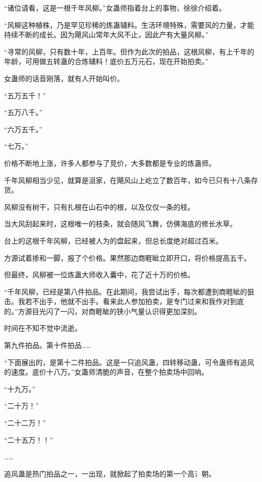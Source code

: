 
\begin{this_body}



“诸位请看，这是一根千年风柳。”女蛊师指着台上的事物，徐徐介绍着。

“风柳这种植株，乃是罕见珍稀的炼蛊辅料。生活环境特殊，需要风的力量，才能持续不断的成长。因为飓风山常年大风不止，因此产有大量风柳。”

“寻常的风柳，只有数十年，上百年。但作为此次的拍品，这根风柳，有上千年的年龄，可用做五转蛊的合炼辅料！底价五万元石，现在开始拍卖。”

女蛊师的话音刚落，就有人开始叫价。

“五万五千！”

“五万八千。”

“六万五千。”

“七万。”

价格不断地上涨，许多人都参与了竞价，大多数都是专业的炼蛊师。

千年风柳相当少见，就算是沮家，在飓风山上屹立了数百年，如今已只有十八条存货。

风柳没有树干，只有扎根在山石中的根，以及仅仅一条的枝。

当大风刮起来时，这根唯一的枝条，就会随风飞舞，仿佛海底的修长水草。

台上的这根千年风柳，已经被人为的盘起来，但总长度绝对超过百米。

方源试着掺和一脚，报了个价格。果然那边商睚眦立即开口，将价格提高五千。

但最终，风柳被一位炼蛊大师收入囊中，花了近十万的价格。

“千年风柳，已经是第八件拍品。在此期间，我尝试出手，每次都遭到商睚眦的狙击。我若不出手，他就不出手。看来此人参加拍卖，是专门过来和我作对到底的。”方源目光闪了一闪，对商睚眦的狭小气量认识得更加深刻。

时间在不知不觉中流逝。

第九件拍品。第十件拍品……

“下面展出的，是第十二件拍品。这是一只追风蛊，四转移动蛊，可令蛊师有追风的速度。底价十八万。”女蛊师清脆的声音，在整个拍卖场中回响。

“十九万。”

“二十万！”

“二十二万！”

“二十五万！！”

……

追风蛊是热门拍品之一，一出现，就掀起了拍卖场的第一个高氵朝。


\end{this_body}
